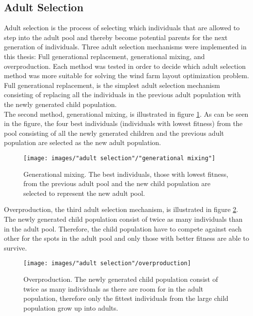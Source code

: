 \subsection{Adult Selection}\label{subsection:adult selection}
Adult selection is the process of selecting which individuals that are allowed to step into the adult pool and thereby become potential parents for the next generation of individuals. Three adult selection mechanisms were implemented in this thesis: Full generational replacement,  generational mixing, and overproduction. Each method was tested in order to decide which adult selection method was more suitable for solving the wind farm layout optimization problem. \\

\noindent Full generational replacement, is the simplest adult selection mechanism consisting of replacing all the individuals in the previous adult population with the newly generated child population. \\

\noindent The second method, generational mixing, is illustrated in figure \ref{figure:generational mixing}. As can be seen in the figure, the four best individuals (individuals with lowest fitness) from the pool consisting of all the newly generated children and the previous adult population are selected as the new adult population. \\


\begin{figure}[h!]
\begin{center}
\texttt{[image: images/"adult selection"/"generational mixing"]}
\caption{Generational mixing. The best individuals, those with lowest fitness, from the previous adult pool and the new child population are selected to represent the new adult pool.}
\label{figure:generational mixing}
\end{center}
\end{figure}


\noindent Overproduction, the third adult selection mechanism, is illustrated in figure \ref{figure:overproduction}. The newly generated child population consist of twice as many individuals than in the adult pool. Therefore, the child population have to compete against each other for the spots in the adult pool and only those with better fitness are able to survive. \\


\begin{figure}[h!]
\begin{center}
\texttt{[image: images/"adult selection"/overproduction]}
\caption{Overproduction. The newly generated child population consist of twice as many individuals as there are room for in the adult population, therefore only the fittest individuals from the large child population grow up into adults.}
\label{figure:overproduction}
\end{center}
\end{figure}



